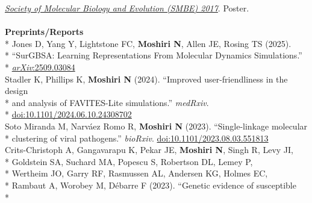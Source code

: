 \documentclass[margin,line]{res}
\begin{document}
\begin{resume}
\hspace*{8mm} \href{https://smbe.org/smbe/}{\textit{Society of Molecular Biology and Evolution (SMBE) 2017}}. Poster.\\
~\\
\textbf{Preprints/Reports}\vspace{2mm}\\*
\hspace*{4mm} Jones D, Yang Y, Lightstone FC, \textbf{Moshiri N}, Allen JE, Rosing TS (2025).\\*
\hspace*{9.5mm} ``SurGBSA: Learning Representations From Molecular Dynamics Simulations.''\\*\vspace{2mm}
\hspace*{8mm} \href{https://arxiv.org/abs/2509.03084}{\textit{arXiv}:2509.03084}\\
\hspace*{4mm} Stadler K, Phillips K, \textbf{Moshiri N} (2024). ``Improved user-friendliness in the design\\*
\hspace*{9.5mm} and analysis of FAVITES-Lite simulations.'' \textit{medRxiv}.\\*\vspace{2mm}
\hspace*{8mm} \href{https://doi.org/10.1101/2024.06.10.24308702}{doi:10.1101/2024.06.10.24308702}\\
\hspace*{4mm} Soto Miranda M, Narv\'{a}ez Romo R, \textbf{Moshiri N} (2023). ``Single-linkage molecular\\*\vspace{2mm}
\hspace*{8mm} clustering of viral pathogens.'' \textit{bioRxiv}. \href{https://doi.org/10.1101/2023.08.03.551813}{doi:10.1101/2023.08.03.551813}\\
\hspace*{4mm} Crits-Christoph A, Gangavarapu K, Pekar JE, \textbf{Moshiri N}, Singh R, Levy JI,\\*
\hspace*{9.5mm} Goldstein SA, Suchard MA, Popescu S, Robertson DL, Lemey P,\\*
\hspace*{9.5mm} Wertheim JO, Garry RF, Rasmussen AL, Andersen KG, Holmes EC,\\*
\hspace*{9.5mm} Rambaut A, Worobey M, D\'ebarre F (2023). ``Genetic evidence of susceptible\\*

\end{resume}
\end{document}
